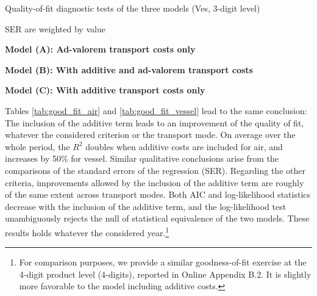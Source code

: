 \documentclass[a4paper,11pt]{article}
\begin{document}
\begin{table}[htbp]
	\centering
	\footnotesize{
		\caption{Quality-of-fit diagnostic tests of the three models (Ves, 3-digit level)}\vspace{5mm}
		\label{tab:good_fit_vessel}%
		
		\begin{tablenotes}
			\tiny
			\item SER are weighted by value
			\item \textbf{Model (A): Ad-valorem transport costs only}
			\item \textbf{Model (B): With additive and ad-valorem transport costs}
			\item \textbf{Model (C): With additive transport costs only}
\end{tablenotes}
}
\end{table}%


Tables \ref{tab:good_fit_air} and \ref{tab:good_fit_vessel} lead to the same conclusion: The inclusion of the additive term leads to an improvement of the quality of fit, whatever the considered criterion or the transport mode.
On average over the whole period, the $R^{2}$ doubles when additive costs are included for air, and increases by 50\% for vessel.
Similar qualitative conclusions arise from the comparisons of the standard errors of the regression (SER).
Regarding the other criteria, improvements allowed by the inclusion of the additive term are roughly of the same extent across transport modes.
Both AIC and log-likelihood statistics decrease with the inclusion of the additive term, and the log-likelihood test unambiguously rejects the null of statistical equivalence of the two models.
These results holds whatever the considered year.\footnote{For comparison purposes, we provide a similar goodness-of-fit exercise at the 4-digit product level (4-digits), reported in Online Appendix B.2. It is slightly more favorable to the model including additive costs.}
\end{document}
